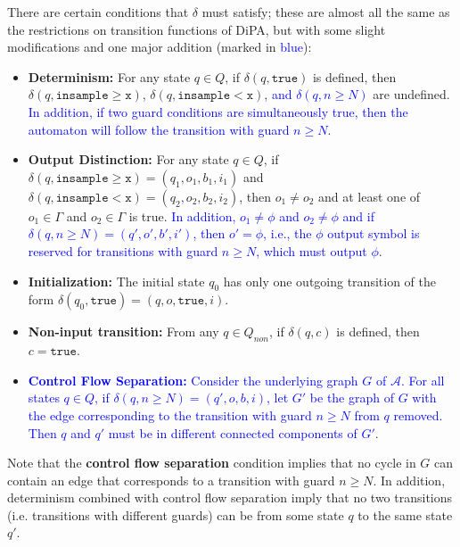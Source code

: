 \documentclass[12pt]{article}
\newcommand{\gguard}{\texttt{insample} \geq \texttt{x}}
\newcommand{\lguard}{\texttt{insample} < \texttt{x}}
\theoremstyle{definition}
\begin{document}
There are certain conditions that $\delta$ must satisfy; these are almost all the same as the restrictions on transition functions of DiPA, but with some slight modifications and one major addition (marked in \textcolor{blue}{blue}):
\begin{itemize}
	\item \textbf{Determinism:} For any state $q\in Q$, if $\delta(q, \texttt{true})$ is defined, then $\delta(q, \texttt{insample} \geq \texttt{x})$, $\delta(q, \texttt{insample} < \texttt{x})$, \textcolor{blue}{and $\delta(q, n\geq N)$} are undefined. \textcolor{blue}{In addition, if two guard conditions are simultaneously true, then the automaton will follow the transition with guard $n \geq N$}.

	\item \textbf{Output Distinction:} For any state $q\in Q$, if $\delta(q, \gguard) = (q_1, o_1, b_1, i_1)$ and $\delta(q, \lguard) = (q_2, o_2, b_2, i_2)$, then $o_1\neq o_2$ and at least one of $o_1\in \Gamma$ and $o_2\in \Gamma$ is true. \textcolor{blue}{In addition, $o_1\neq \phi$ and $o_2\neq \phi$ and if $\delta(q, n\geq N) = (q', o', b', i')$, then $o' = \phi$, i.e., the $\phi$ output symbol is reserved for transitions with guard $n\geq N$, which must output $\phi$}.

	\item \textbf{Initialization:} The initial state $q_0$ has only one outgoing transition of the form $\delta(q_0, \texttt{true}) = (q, o, \texttt{true}, i)$.

	\item \textbf{Non-input transition:} From any $q\in Q_{non}$, if $\delta(q, c)$ is defined, then $c=\texttt{true}$.

	\item \textcolor{blue}{\textbf{Control Flow Separation:} Consider the underlying graph $G$ of $\mathcal{A}$. For all states $q\in Q$, if $\delta(q, n\geq N) = (q', o, b, i)$, let $G'$ be the graph of $G$ with the edge corresponding to the transition with guard $n\geq N$ from $q$ removed. Then $q$ and $q'$ must be in different connected components of $G'$}.

\end{itemize}

Note that the \textbf{control flow separation} condition implies that no cycle in $G$ can contain an edge that corresponds to a transition with guard $n\geq N$. In addition, determinism combined with control flow separation imply that no two transitions (i.e. transitions with different guards) can be from some state $q$ to the same state $q'$. 
\end{document}
